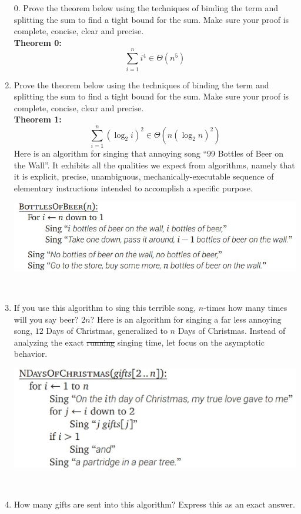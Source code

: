 \documentclass[12pt]{article}
\begin{document}
\begin{enumerate}
\item[0. ] Prove the theorem below using the techniques of binding the term and splitting the
sum to find a tight bound for the sum. Make sure your proof is complete, concise, clear
and precise.\\
\textbf{Theorem 0: }
$$\sum\limits_{i=1}^{n}i^4\in\Theta(n^5)$$
\newpage
\item Prove the theorem below using the techniques of binding the term and splitting the
sum to find a tight bound for the sum. Make sure your proof is complete, concise, clear
and precise.\\
\textbf{Theorem 1: }
$$\sum\limits_{i=1}^{n}(\log_2{i})^2\in\Theta(n(\log_2{n})^2)$$
\newpage
Here is an algorithm for singing that annoying song ``99 Bottles of Beer on the Wall''.
It exhibits all the qualities we expect from algorithms, namely that it is explicit, 
precise, unambiguous, mechanically-executable sequence of elementary instructions intended to 
accomplish a specific purpose.\\
\centerline{\includegraphics[scale = .6]{BoBeer.JPG}}\\
\item If you use this algorithm to sing this terrible song, $n$-times how many times will you say beer? $2n$? 
\newpage
Here is an algorithm for singing a far less annoying song, $12$ Days of Christmas, generalized to $n$ 
Days of Christmas. Instead of analyzing the exact \st{running} singing time, let focus on the asymptotic behavior. \\
\centerline{\includegraphics[scale = .5]{NDaysOfChristmas.JPG}}\\
\item How many gifts are sent into this algorithm? Express this as an exact answer.

\end{enumerate}
\end{document}
